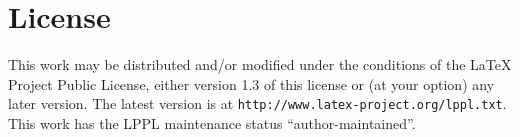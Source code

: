 \documentclass[11pt]{article}
\begin{document}
\section{License}\label{sec:license12}

This work may be distributed and/or modified under
the conditions of the \LaTeX{} Project Public License, either version 1.3 of this license or (at your
option) any later version. The latest version is at \texttt{http://www.latex-project.org/lppl.txt}. This
work has the LPPL maintenance status ``author-maintained''.
\end{document}
